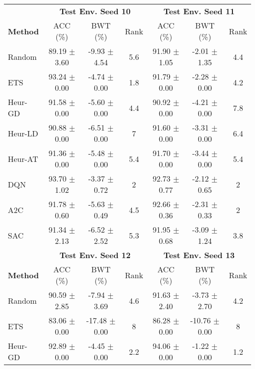 \begin{tabular}{lcccccc}
	\toprule 
	& \multicolumn{3}{c}{\textbf{Test Env. Seed 10}} & \multicolumn{3}{c}{\textbf{Test Env. Seed 11}} \\
	\cmidrule(lr){2-4} \cmidrule(lr){5-7}
	\textbf{Method} & ACC (\%)          & BWT (\%)          & Rank   & ACC (\%)          & BWT (\%)          & Rank   \\
	\midrule 
	Random          & 89.19 $\pm$ 3.60    & -9.93 $\pm$ 4.54    & 5.6    & 91.90 $\pm$ 1.05    & -2.01 $\pm$ 1.35    & 4.4    \\
	ETS             & 93.24 $\pm$ 0.00    & -4.74 $\pm$ 0.00    & 1.8    & 91.79 $\pm$ 0.00    & -2.28 $\pm$ 0.00    & 4.2    \\
	Heur-GD         & 91.58 $\pm$ 0.00    & -5.60 $\pm$ 0.00    & 4.4    & 90.92 $\pm$ 0.00    & -4.21 $\pm$ 0.00    & 7.8    \\
	Heur-LD         & 90.88 $\pm$ 0.00    & -6.51 $\pm$ 0.00    & 7      & 91.60 $\pm$ 0.00    & -3.31 $\pm$ 0.00    & 6.4    \\
	Heur-AT         & 91.36 $\pm$ 0.00    & -5.48 $\pm$ 0.00    & 5.4    & 91.70 $\pm$ 0.00    & -3.44 $\pm$ 0.00    & 5.4    \\
	DQN             & 93.70 $\pm$ 1.02    & -3.37 $\pm$ 0.72    & 2      & 92.73 $\pm$ 0.77    & -2.12 $\pm$ 0.65    & 2      \\
	A2C             & 91.78 $\pm$ 0.60    & -5.63 $\pm$ 0.49    & 4.5    & 92.66 $\pm$ 0.36    & -2.31 $\pm$ 0.33    & 2      \\
	SAC             & 91.34 $\pm$ 2.13    & -6.52 $\pm$ 2.52    & 5.3    & 91.95 $\pm$ 0.68    & -3.09 $\pm$ 1.24    & 3.8    \\
	\midrule 
	& \multicolumn{3}{c}{\textbf{Test Env. Seed 12}} & \multicolumn{3}{c}{\textbf{Test Env. Seed 13}} \\
	\cmidrule(lr){2-4} \cmidrule(lr){5-7}
	\textbf{Method} & ACC (\%)          & BWT (\%)          & Rank   & ACC (\%)          & BWT (\%)          & Rank   \\
	\midrule 
	Random          & 90.59 $\pm$ 2.85    & -7.94 $\pm$ 3.69    & 4.6    & 91.63 $\pm$ 2.40    & -3.73 $\pm$ 2.70    & 4.2    \\
	ETS             & 83.06 $\pm$ 0.00    & -17.48 $\pm$ 0.00   & 8      & 86.28 $\pm$ 0.00    & -10.76 $\pm$ 0.00   & 8      \\
	Heur-GD         & 92.89 $\pm$ 0.00    & -4.45 $\pm$ 0.00    & 2.2    & 94.06 $\pm$ 0.00    & -1.22 $\pm$ 0.00    & 1.2    \\

\end{tabular}
